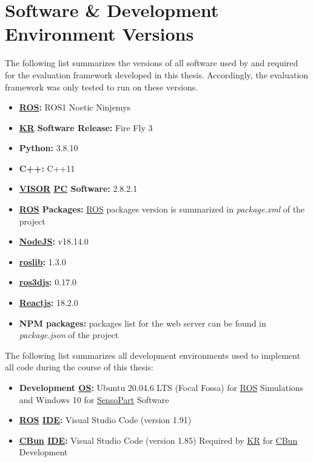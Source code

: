 \section{Software \& Development Environment Versions}
\label{sec:versions}

The following list summarizes the versions of all software used by and required for the
evaluation framework developed in this thesis. Accordingly, the evaluation framework
was only tested to run on these versions.

\begin{itemize}
    \item \textbf{\hyperref[acro:ROS]{ROS}:} ROS1 Noetic Ninjemys
    \item \textbf{\hyperref[acro:KR]{KR} Software Release:} Fire Fly 3
    \item \textbf{Python:} 3.8.10
    \item \textbf{C++:} C++11
    \item \textbf{\hyperref[acro:VISOR]{VISOR\textsuperscript{\textregistered}} \hyperref[acro:PC]{PC} Software:} 2.8.2.1
    \item \textbf{\hyperref[acro:ROS]{ROS} Packages:} \hyperref[acro:ROS]{ROS} packages version is summarized in \textit{package.xml} of the project
    \item \textbf{\hyperref[par:nodejs]{NodeJS}:} v18.14.0
    \item \textbf{\hyperref[par:roslibjs]{roslib}:} 1.3.0
    \item \textbf{\hyperref[par:ros3djs]{ros3djs}:} 0.17.0
    \item \textbf{\hyperref[par:reactjs]{Reactjs}:} 18.2.0
    \item \textbf{NPM packages:} packages list for the web server can be found in \textit{package.json} of the project
\end{itemize}

The following list summarizes all development environments used to implement all code
during the course of this thesis:

\begin{itemize}
    \item \textbf{Development \hyperref[acro:OS]{OS}:} Ubuntu 20.04.6 LTS (Focal Fossa) for \hyperref[acro:ROS]{ROS} Simulations and Windows 10 for \hyperref[acro:SensoPart]{SensoPart} Software
    \item \textbf{\hyperref[acro:ROS]{ROS} \hyperref[acro:IDE]{IDE}:} Visual Studio Code (version 1.91)
    \item \textbf{\hyperref[acro:CBun]{CBun} \hyperref[acro:IDE]{IDE}:} Visual Studio Code (version 1.85) Required by \hyperref[acro:KR]{KR} for \hyperref[acro:CBun]{CBun} Development
\end{itemize}

\newpage